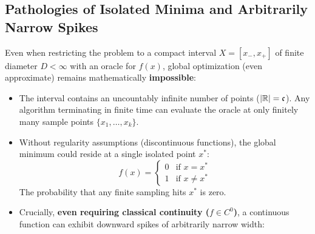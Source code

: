 \subsection{Pathologies of Isolated Minima and Arbitrarily Narrow Spikes}
Even when restricting the problem to a compact interval $X = [x_-, x_+]$ of finite diameter $D < \infty$ with an oracle for $f(x)$, global optimization (even approximate) remains mathematically \textbf{impossible}:
\begin{itemize}
    \item The interval contains an uncountably infinite number of points ($|\mathbb{R}| = \mathfrak{c}$). Any algorithm terminating in finite time can evaluate the oracle at only finitely many sample points $\{x_1, \dots, x_k\}$.
    \item Without regularity assumptions (discontinuous functions), the global minimum could reside at a single isolated point $x^*$:
    \begin{equation}
        f(x) = \begin{cases} 0 & \text{if } x = x^* \\ 1 & \text{if } x \neq x^* \end{cases}
    \end{equation}
    The probability that any finite sampling hits $x^*$ is zero.
    \item Crucially, \textbf{even requiring classical continuity ($f \in C^0$)}, a continuous function can exhibit downward spikes of arbitrarily narrow width:
\end{itemize}

